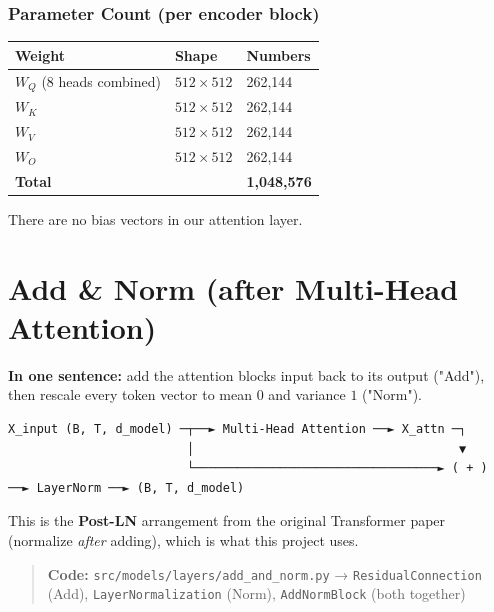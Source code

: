 \documentclass[11pt,a4paper,oneside]{report}
\begin{document}
\subsection{Parameter Count (per encoder block)}\label{parameter-count-per-encoder-block}

{\def\LTcaptype{none} %
\begin{longtable}[]{@{}lll@{}}
\toprule\noalign{}
Weight & Shape & Numbers \\
\midrule\noalign{}
\endhead
\bottomrule\noalign{}
\endlastfoot
\(W_Q\) (8 heads combined) & \(512 \times 512\) & 262,144 \\
\(W_K\) & \(512 \times 512\) & 262,144 \\
\(W_V\) & \(512 \times 512\) & 262,144 \\
\(W_O\) & \(512 \times 512\) & 262,144 \\
\textbf{Total} & & \textbf{1,048,576} \\
\end{longtable}
}

There are no bias vectors in our attention layer.




\chapter{Add \& Norm (after Multi-Head Attention)}\label{add--norm-after-multi-head-attention}

\textbf{In one sentence:} add the attention block\textquotesingle s input back to its output ("Add"), then rescale every token vector to mean \(0\) and variance \(1\) ("Norm").

\begin{Verbatim}[fontsize=\scriptsize]
X_input (B, T, d_model) ─┬──► Multi-Head Attention ──► X_attn ─┐
                         │                                     ▼
                         └──────────────────────────────────► ( + ) ──► LayerNorm ──► (B, T, d_model)
\end{Verbatim}

This is the \textbf{Post-LN} arrangement from the original Transformer paper (normalize \emph{after} adding), which is what this project uses.

\begin{quote}
\textbf{Code:} \texttt{src/\allowbreak{}models/\allowbreak{}layers/\allowbreak{}add\_\allowbreak{}and\_\allowbreak{}norm.\allowbreak{}py} → \texttt{ResidualConnection} (Add), \texttt{LayerNormalization} (Norm), \texttt{AddNormBlock} (both together)
\end{quote}
\end{document}
